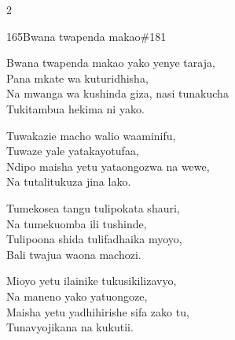 \documentclass{article}
\begin{document}
\begin{multicols}{2}
\begin{hymn}{165}{Bwana twapenda makao}{\#181}
\begin{stanza}
Bwana twapenda makao yako yenye taraja,\\
Pana mkate wa kuturidhisha,\\
Na mwanga wa kushinda giza, nasi tunakucha\\
Tukitambua hekima ni yako.
\end{stanza}
\begin{chorus}
Tuwakazie macho walio waaminifu,\\
Tuwaze yale yatakayotufaa,\\
Ndipo maisha yetu yataongozwa na wewe,\\
Na tutalitukuza jina lako.
\end{chorus}
\begin{stanza}
Tumekosea tangu tulipokata shauri,\\
Na tumekuomba ili tushinde,\\
Tulipoona shida tulifadhaika myoyo,\\
Bali twajua waona machozi.
\end{stanza}
\begin{stanza}
Mioyo yetu ilainike tukusikilizavyo,\\
Na maneno yako yatuongoze,\\
Maisha yetu yadhihirishe sifa zako tu,\\
Tunavyojikana na kukutii.
\end{stanza}
\end{hymn}


\end{multicols}
\end{document}
